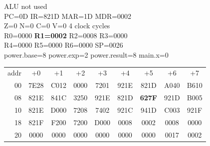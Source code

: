 \begin{tcolorbox}[stepbox, title={Step 17 \hfill PC 0C \quad LD R1, power.exp}]
\textcolor{dim}{ALU} \textcolor{dim}{not used}\\
PC=0D IR=821D MAR=1D MDR=0002\\
Z=0 N=0 C=0 V=0 \hfill \textcolor{dim}{4 clock cycles}\\
R0=0000 \textcolor{wrt}{\textbf{R1=0002}} R2=0008 R3=0000\\
R4=0000 R5=0000 R6=0000 SP=0026\\
\textcolor{dim}{power.base=8  power.exp=2  power.result=8  main.x=0}\\[1pt]
{\setlength{\tabcolsep}{1.6pt}\begin{tabular}{@{}r*{8}{c}@{}}
\textcolor{dim}{addr} & \textcolor{dim}{+0} & \textcolor{dim}{+1} & \textcolor{dim}{+2} & \textcolor{dim}{+3} & \textcolor{dim}{+4} & \textcolor{dim}{+5} & \textcolor{dim}{+6} & \textcolor{dim}{+7}\\
\textcolor{dim}{00} & 7E28 & C012 & 0000 & 7201 & 921E & 821D & A040 & B610\\
\textcolor{dim}{08} & 821E & 841C & 3250 & 921E & 821D & \cellcolor{pcc}\textbf{627F} & 921D & B005\\
\textcolor{dim}{10} & 821E & D000 & 7208 & 7402 & 921C & 941D & C003 & 921F\\
\textcolor{dim}{18} & 821F & F200 & 7200 & D000 & \cellcolor{datac}0008 & \cellcolor{datac}0002 & \cellcolor{datac}0008 & \cellcolor{datac}0000\\
\textcolor{dim}{20} & \cellcolor{stackc}0000 & \cellcolor{stackc}0000 & \cellcolor{stackc}0000 & \cellcolor{stackc}0000 & \cellcolor{stackc}0000 & \cellcolor{stackc}0000 & \cellcolor{stackc}0017 & \cellcolor{stackc}0002\\
\end{tabular}}
\end{tcolorbox}\par\vspace{3pt}
